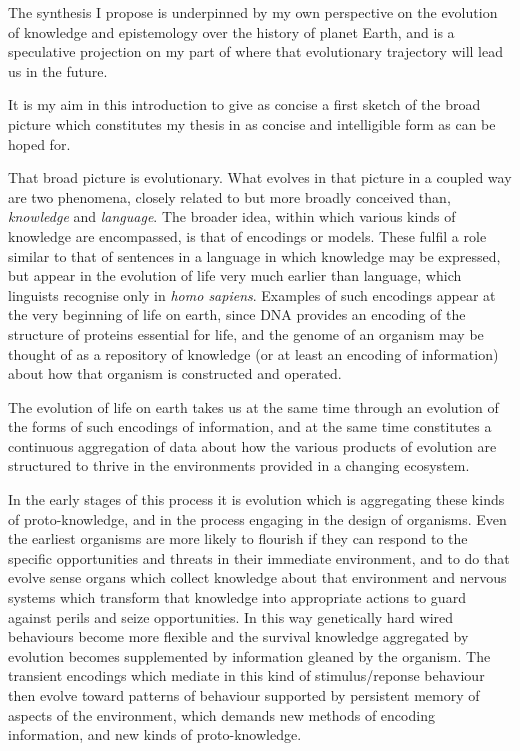 \documentclass[10pt,titlepage]{book}
\begin{document}
The synthesis I propose is underpinned by my own perspective on the evolution of knowledge and epistemology over the history of planet Earth, and is a speculative projection on my part of where that evolutionary trajectory will lead us in the future.

It is my aim in this introduction to give as concise a first sketch of the broad picture which constitutes my thesis in as concise and intelligible form as can be hoped for.

That broad picture is evolutionary.
What evolves in that picture in a coupled way are two phenomena, closely related to but more broadly conceived than, \emph{knowledge} and \emph{language}.
The broader idea, within which various kinds of knowledge are encompassed, is that of encodings or models.
These fulfil a role similar to that of sentences in a language in which knowledge may be expressed, but appear in the evolution of life very much earlier than language, which linguists recognise only in \emph{homo sapiens}.
Examples of such encodings appear at the very beginning of life on earth, since DNA provides an encoding of the structure of proteins essential for life, and the genome of an organism may be thought of as a repository of knowledge (or at least an encoding of information) about how that organism is constructed and operated.

The evolution of life on earth takes us at the same time through an evolution of the forms of such encodings of information, and at the same time constitutes a continuous aggregation of data about how the various products of evolution are structured to thrive in the environments provided in a changing ecosystem.

In the early stages of this process it is evolution which is aggregating these kinds of proto-knowledge, and in the process engaging in the design of organisms.
Even the earliest organisms are more likely to flourish if they can respond to the specific opportunities and threats in their immediate environment, and to do that evolve sense organs which collect knowledge about that environment and nervous systems which transform that knowledge into appropriate actions to guard against perils and seize opportunities.
In this way genetically hard wired behaviours become more flexible and the survival knowledge aggregated by evolution becomes supplemented by information gleaned by the organism.
The transient encodings which mediate in this kind of stimulus/reponse behaviour then evolve toward patterns of behaviour supported by persistent memory of aspects of the environment, which demands new methods of encoding information, and new kinds of proto-knowledge.
\end{document}
